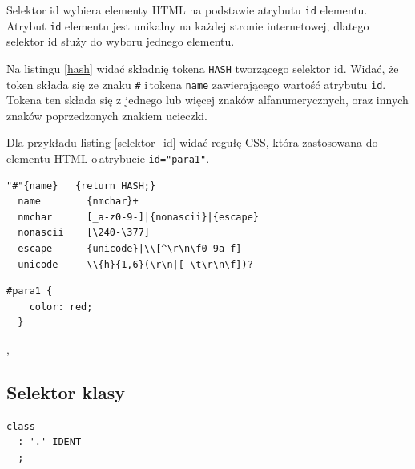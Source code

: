 \documentclass[a4paper,12pt]{book} %
\begin{document}
Selektor id wybiera elementy HTML na podstawie atrybutu \lstinline{id} elementu.
Atrybut \lstinline|id| elementu jest unikalny na każdej stronie internetowej, dlatego selektor id służy do wyboru jednego elementu.

Na listingu \ref{hash} widać składnię tokena \lstinline|HASH| tworzącego selektor id. Widać, że token składa się ze znaku \lstinline|#| i\,tokena \lstinline|name| zawierającego wartość atrybutu \lstinline|id|. Tokena ten składa się z jednego lub więcej znaków alfanumerycznych, oraz innych znaków poprzedzonych znakiem ucieczki.

Dla przykładu listing \ref{selektor_id} widać regułę CSS, która zastosowana do elementu HTML o\,atrybucie \lstinline{id="para1"}.

\begin{lstfloat}[hb]
  \lstset{language=HTML}
  \begin{lstlisting}[frame=single]
  "#"{name}   {return HASH;}
  name        {nmchar}+
  nmchar      [_a-z0-9-]|{nonascii}|{escape}
  nonascii    [\240-\377]
  escape      {unicode}|\\[^\r\n\f0-9a-f]
  unicode     \\{h}{1,6}(\r\n|[ \t\r\n\f])?
\end{lstlisting}
  \caption{Składnia tokena \lstinline|HASH| zwracanego przez lekser CSS \cite{GrammarofCSS}}\label{hash}
\end{lstfloat}

\begin{lstfloat}[hb]
  \lstset{language=HTML}
  \begin{lstlisting}[frame=single]
  #para1 {
    color: red;
  }\end{lstlisting}

  \caption{Reguła z selektorem elementu HTML o\,atrybucie \lstinline{id="para1"}},
  \label{selektor_id}

\end{lstfloat}


\clearpage
\subsection{Selektor klasy}
\begin{lstfloat}[hb]
  \lstset{language=HTML}
  \begin{lstlisting}[frame=single]
class
  : '.' IDENT
  ;
\end{lstlisting}
  \caption{Składnia selektora klasy CSS \cite{GrammarofCSS}}\label{class}
\end{lstfloat}
\end{document}
